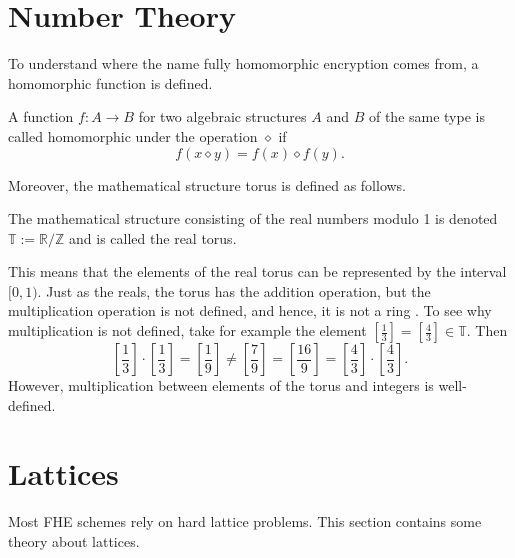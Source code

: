 


\section{Number Theory}

To understand where the name fully homomorphic encryption comes from, a homomorphic function is defined.
\begin{definition}
    A function $f: A \to B$ for two algebraic structures $A$ and $B$ of the same type is called homomorphic under the operation $\diamond$ if
    $$f(x \diamond y) = f(x) \diamond f(y).$$
\end{definition}

Moreover, the mathematical structure torus is defined as follows.
\begin{definition}
    The mathematical structure consisting of the real numbers modulo 1 is denoted $\mathbb{T} := \mathbb{R} / \mathbb{Z}$ and is called the real torus.
\end{definition}
This means that the elements of the real torus can be represented by the interval $[0,1)$. Just as the reals, the torus has the addition operation, but the multiplication operation is not defined, and hence, it is not a ring \cite{cite:tfhe_guide}. To see why multiplication is not defined, take for example the element $\left[\frac{1}{3}\right] = \left[\frac{4}{3}\right] \in \mathbb{T}$. Then
$$\left[\frac{1}{3}\right] \cdot \left[\frac{1}{3}\right] = \left[\frac{1}{9}\right] \neq \left[\frac{7}{9}\right] = \left[\frac{16}{9}\right] = \left[\frac{4}{3}\right] \cdot \left[\frac{4}{3}\right].$$
However, multiplication between elements of the torus and integers is well-defined.



\section{Lattices}
Most FHE schemes rely on hard lattice problems. This section contains some theory about lattices.

